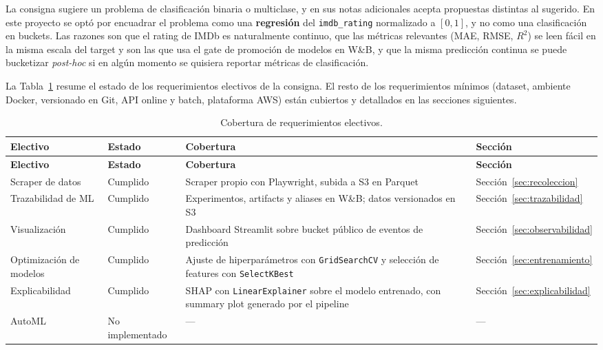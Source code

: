 \documentclass[letterpaper,12pt]{article}
\begin{document}
La consigna sugiere un problema de clasificación binaria o multiclase, y en sus notas adicionales acepta propuestas distintas al sugerido. En este proyecto se optó por encuadrar el problema como una \textbf{regresión} del \texttt{imdb\_rating} normalizado a $[0, 1]$, y no como una clasificación en buckets. Las razones son que el rating de IMDb es naturalmente continuo, que las métricas relevantes (MAE, RMSE, $R^2$) se leen fácil en la misma escala del target y son las que usa el gate de promoción de modelos en W\&B, y que la misma predicción continua se puede bucketizar \emph{post-hoc} si en algún momento se quisiera reportar métricas de clasificación.

La Tabla~\ref{tab:req-electivos} resume el estado de los requerimientos electivos de la consigna. El resto de los requerimientos mínimos (dataset, ambiente Docker, versionado en Git, API online y batch, plataforma AWS) están cubiertos y detallados en las secciones siguientes.

\begin{longtable}{p{4.5cm}p{2.5cm}p{4.5cm}p{4cm}}
\caption{Cobertura de requerimientos electivos.}
\label{tab:req-electivos} \\
\toprule
\textbf{Electivo} & \textbf{Estado} & \textbf{Cobertura} & \textbf{Sección} \\
\midrule
\endfirsthead
\toprule
\textbf{Electivo} & \textbf{Estado} & \textbf{Cobertura} & \textbf{Sección} \\
\midrule
\endhead
Scraper de datos & Cumplido & Scraper propio con Playwright, subida a S3 en Parquet & Sección~\ref{sec:recoleccion} \\
Trazabilidad de ML & Cumplido & Experimentos, artifacts y aliases en W\&B; datos versionados en S3 & Sección~\ref{sec:trazabilidad} \\
Visualización & Cumplido & Dashboard Streamlit sobre bucket público de eventos de predicción & Sección~\ref{sec:observabilidad} \\
Optimización de modelos & Cumplido & Ajuste de hiperparámetros con \texttt{GridSearchCV} y selección de features con \texttt{SelectKBest} & Sección~\ref{sec:entrenamiento} \\
Explicabilidad & Cumplido & SHAP con \texttt{LinearExplainer} sobre el modelo entrenado, con summary plot generado por el pipeline & Sección~\ref{sec:explicabilidad} \\
AutoML & No implementado & --- & --- \\
\bottomrule
\end{longtable}
\end{document}
